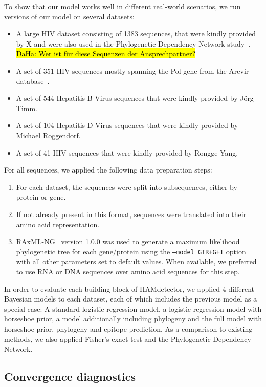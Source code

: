 \documentclass[fleqn,11pt]{SelfArx} %
\begin{document}
To show that our model works well in different real-world scenarios, we run versions of our model on several datasets:

\begin{itemize}
  \item A large HIV dataset consisting of 1383 sequences, that were kindly provided by X and were also used in the Phylogenetic Dependency Network study~\cite{Carlson2008}. \hl{DaHa: Wer ist für diese Sequenzen der Ansprechpartner?}
  \item A set of 351 HIV sequences mostly spanning the Pol gene from the Arevir database~\cite{Roomp2006}.
  \item A set of 544 Hepatitis-B-Virus sequences that were kindly provided by Jörg Timm.
  \item A set of 104 Hepatitis-D-Virus sequences that were kindly provided by Michael Roggendorf.
  \item A set of 41 HIV sequences that were kindly provided by Rongge Yang.
\end{itemize}

For all sequences, we applied the following data preparation steps:

\begin{enumerate}
  \item For each dataset, the sequences were split into subsequences, either by protein or gene.
  \item If not already present in this format, sequences were translated into their amino acid representation.
  \item RAxML-NG~\cite{Kozlov2019} version 1.0.0 was used to generate a maximum likelihood phylogenetic tree for each gene/protein using the \texttt{--model GTR+G+I} option with all other parameters set to default values. When available, we preferred to use RNA or DNA sequences over amino acid sequences for this step.
\end{enumerate}

In order to evaluate each building block of HAMdetector, we applied 4 different Bayesian models to each dataset, each of which includes the previous model as a special case:
A standard logistic regression model, a logistic regression model with horseshoe prior, a model additionally including phylogeny and the full model with horseshoe prior, phylogeny and epitope prediction.
As a comparison to existing methods, we also applied Fisher's exact test and the Phylogenetic Dependency Network.

\subsection*{Convergence diagnostics}
\end{document}
